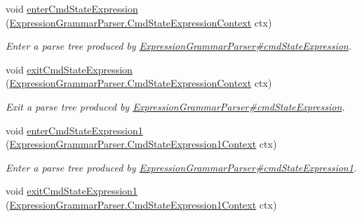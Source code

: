\begin{DoxyCompactItemize}
void \hyperlink{interfacegov_1_1nasa_1_1jpf_1_1inspector_1_1server_1_1expression_1_1parser_1_1_expression_grammar_listener_a1d280456338ade7c03cb3e6378e82931}{enter\+Cmd\+State\+Expression} (\hyperlink{classgov_1_1nasa_1_1jpf_1_1inspector_1_1server_1_1expression_1_1parser_1_1_expression_grammar_pa37db371aaa956234112b7f14e4ab3f14}{Expression\+Grammar\+Parser.\+Cmd\+State\+Expression\+Context} ctx)
\begin{DoxyCompactList}\small\item\em Enter a parse tree produced by \hyperlink{classgov_1_1nasa_1_1jpf_1_1inspector_1_1server_1_1expression_1_1parser_1_1_expression_grammar_parser_a01e4723731d7e4c98df739e03c7c7f37}{Expression\+Grammar\+Parser\#cmd\+State\+Expression}. \end{DoxyCompactList}\item 
void \hyperlink{interfacegov_1_1nasa_1_1jpf_1_1inspector_1_1server_1_1expression_1_1parser_1_1_expression_grammar_listener_a4d9c669e27aa7396ffd04c5d2c094460}{exit\+Cmd\+State\+Expression} (\hyperlink{classgov_1_1nasa_1_1jpf_1_1inspector_1_1server_1_1expression_1_1parser_1_1_expression_grammar_pa37db371aaa956234112b7f14e4ab3f14}{Expression\+Grammar\+Parser.\+Cmd\+State\+Expression\+Context} ctx)
\begin{DoxyCompactList}\small\item\em Exit a parse tree produced by \hyperlink{classgov_1_1nasa_1_1jpf_1_1inspector_1_1server_1_1expression_1_1parser_1_1_expression_grammar_parser_a01e4723731d7e4c98df739e03c7c7f37}{Expression\+Grammar\+Parser\#cmd\+State\+Expression}. \end{DoxyCompactList}\item 
void \hyperlink{interfacegov_1_1nasa_1_1jpf_1_1inspector_1_1server_1_1expression_1_1parser_1_1_expression_grammar_listener_a20a24ffa4da3206204f86cd1fdfdf34e}{enter\+Cmd\+State\+Expression1} (\hyperlink{classgov_1_1nasa_1_1jpf_1_1inspector_1_1server_1_1expression_1_1parser_1_1_expression_grammar_pa1eb341e049a8047f26aa8b84266a8b94}{Expression\+Grammar\+Parser.\+Cmd\+State\+Expression1\+Context} ctx)
\begin{DoxyCompactList}\small\item\em Enter a parse tree produced by \hyperlink{classgov_1_1nasa_1_1jpf_1_1inspector_1_1server_1_1expression_1_1parser_1_1_expression_grammar_parser_a1497794a3a59d8319803998a35dbb16e}{Expression\+Grammar\+Parser\#cmd\+State\+Expression1}. \end{DoxyCompactList}\item 
void \hyperlink{interfacegov_1_1nasa_1_1jpf_1_1inspector_1_1server_1_1expression_1_1parser_1_1_expression_grammar_listener_a5f4828f98c21f678704b7f0eb792f48a}{exit\+Cmd\+State\+Expression1} (\hyperlink{classgov_1_1nasa_1_1jpf_1_1inspector_1_1server_1_1expression_1_1parser_1_1_expression_grammar_pa1eb341e049a8047f26aa8b84266a8b94}{Expression\+Grammar\+Parser.\+Cmd\+State\+Expression1\+Context} ctx)

\end{DoxyCompactItemize}
